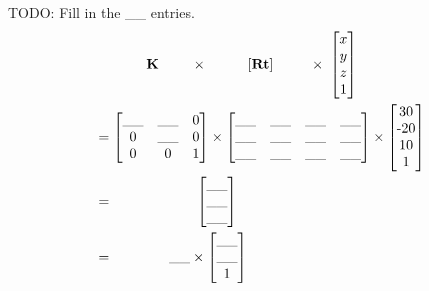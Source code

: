 \documentclass{csci1430}
\begin{document}
\begin{answer}
TODO: Fill in the \_\_ entries.
\begin{align*}
    & \hspace{1.3cm} \mathbf{K} \hspace{0.8cm} \times \hspace{1cm} [\mathbf{R} \mathbf{t}] \hspace{0.9cm} \times \; 
    \begin{bmatrix} 
        x  \\ 
        y  \\ 
        z  \\
        1
    \end{bmatrix} \\
    &= \begin{bmatrix} 
    \_\_ & \_\_ & $0$    \\  %
    $0$ & \_\_ & $0$     \\  %
    $0$ & $0$ & $1$ 
    \end{bmatrix} 
    \times
    \begin{bmatrix} 
    \_\_ & \_\_ & \_\_ & \_\_  \\ %
    \_\_ & \_\_ & \_\_ & \_\_  \\ %
    \_\_ & \_\_ & \_\_ & \_\_     %
    \end{bmatrix} \times
    \begin{bmatrix} 
    $30$    \\ 
    $-20$   \\ 
    $10$    \\ 
    $1$ \end{bmatrix} \\
    &= \qquad \qquad \qquad \begin{bmatrix} 
    \_\_    \\   %
    \_\_    \\   %
    \_\_         %
    \end{bmatrix} \\
    &= \qquad \quad \quad 
    \_\_         %
    \times 
    \begin{bmatrix}  
    \_\_    \\   %
    \_\_    \\   %
    $1$ 
    \end{bmatrix}
\end{align*}
\end{answer}
\end{document}
